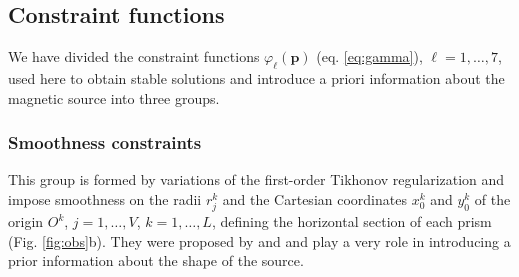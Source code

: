 \subsection{Constraint functions}\label{sec:constraints}

We have divided the constraint functions $\varphi_{\ell}(\mathbf{p})$ (eq. \ref{eq:gamma}), $\ell = 1, \dots, 7$, used here to 
obtain stable solutions and introduce a priori information about the magnetic source into three groups.



\subsubsection{Smoothness constraints}

This group is formed by variations of the first-order Tikhonov regularization \citep[][ p. 103]{aster-etal2019}
and impose smoothness on the radii $r_{j}^{k}$ and the Cartesian coordinates $x_{0}^{k}$ and $y_{0}^{k}$ of the origin 
$O^{k}$, $j = 1, \dots, V$, $k = 1, \dots, L$, defining the horizontal section of each prism (Fig. \ref{fig:obs}b).
They were proposed by \cite{oliveirajr-etal2011} and \cite{oliveirajr-barbosa2013} and play a very 
role in introducing a prior information about the shape of the source. 

